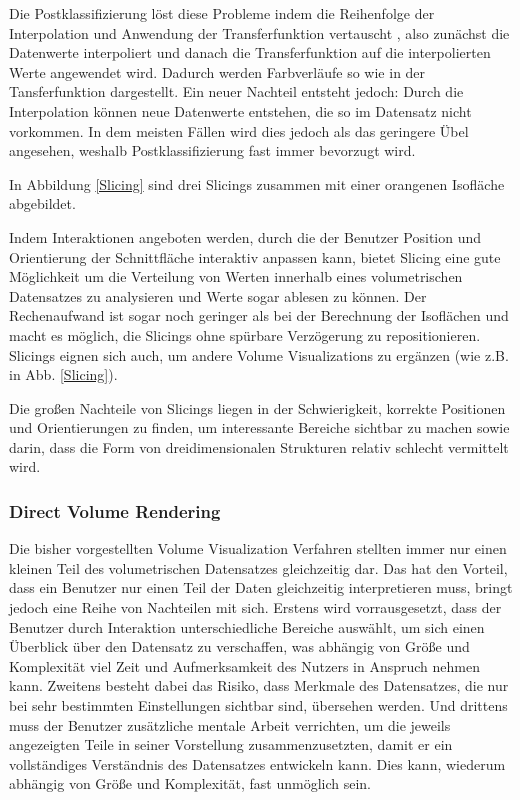 \documentclass[a4paper,fontsize=12pt,toc=bib,halfparskip]{scrartcl}
\begin{document}
Die Postklassifizierung l\"ost diese Probleme indem die Reihenfolge der Interpolation und Anwendung der Transferfunktion vertauscht , also zun\"achst die Datenwerte interpoliert und danach die Transferfunktion auf die interpolierten Werte angewendet wird. Dadurch werden Farbverl\"aufe so wie in der Tansferfunktion dargestellt. Ein neuer Nachteil entsteht jedoch: Durch die Interpolation k\"onnen neue Datenwerte entstehen, die so im Datensatz nicht vorkommen. In dem meisten F\"allen wird dies jedoch als das geringere \"Ubel angesehen, weshalb Postklassifizierung fast immer bevorzugt wird.

In Abbildung \ref{Slicing} sind drei Slicings zusammen mit einer orangenen Isofl\"ache abgebildet.

Indem Interaktionen angeboten werden, durch die der Benutzer Position und Orientierung der Schnittfl\"ache interaktiv anpassen kann, bietet Slicing eine gute M\"oglichkeit um die Verteilung von Werten innerhalb eines volumetrischen Datensatzes zu analysieren und Werte sogar ablesen zu k\"onnen. Der Rechenaufwand ist sogar noch geringer als bei der Berechnung der Isofl\"achen und macht es m\"oglich, die Slicings ohne sp\"urbare Verz\"ogerung zu repositionieren. Slicings eignen sich auch, um andere Volume Visualizations zu erg\"anzen (wie z.B. in Abb. \ref{Slicing}).

Die gro{\ss}en Nachteile von Slicings liegen in der Schwierigkeit, korrekte Positionen und Orientierungen zu finden, um interessante Bereiche sichtbar zu machen sowie darin, dass die Form von dreidimensionalen Strukturen relativ schlecht vermittelt wird. 

\subsubsection{Direct Volume Rendering}
Die bisher vorgestellten Volume Visualization Verfahren stellten immer nur einen kleinen Teil des volumetrischen Datensatzes gleichzeitig dar. Das hat den Vorteil, dass ein Benutzer nur einen Teil der Daten gleichzeitig interpretieren muss, bringt jedoch eine Reihe von Nachteilen mit sich. Erstens wird vorrausgesetzt, dass der Benutzer durch Interaktion unterschiedliche Bereiche ausw\"ahlt, um sich einen \"Uberblick \"uber den Datensatz zu verschaffen, was abh\"angig von Gr\"o{\ss}e und Komplexit\"at viel Zeit und Aufmerksamkeit des Nutzers in Anspruch nehmen kann. Zweitens besteht dabei das Risiko, dass Merkmale des Datensatzes, die nur bei sehr bestimmten Einstellungen sichtbar sind, \"ubersehen werden. Und drittens muss der Benutzer zus\"atzliche mentale Arbeit verrichten, um die jeweils angezeigten Teile in seiner Vorstellung zusammenzusetzten, damit er ein vollst\"andiges Verst\"andnis des Datensatzes entwickeln kann. Dies kann, wiederum abh\"angig von Gr\"o{\ss}e und Komplexit\"at, fast unm\"oglich sein.
\end{document}
